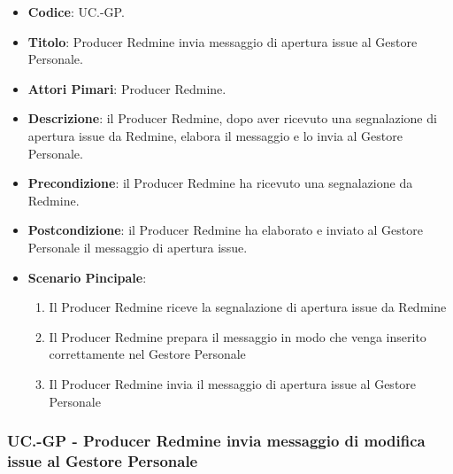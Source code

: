 	\begin{itemize}
		\item \textbf{Codice}: UC\theuccount.\thesubuccount-GP.
		\item \textbf{Titolo}: Producer Redmine invia messaggio di apertura issue al Gestore Personale.
		\item \textbf{Attori Pimari}: Producer Redmine.
		\item \textbf{Descrizione}: il Producer Redmine, dopo aver
		ricevuto una segnalazione di apertura issue da Redmine, elabora il messaggio e lo invia al Gestore Personale.
		\item \textbf{Precondizione}: il Producer Redmine ha ricevuto una segnalazione da Redmine.
		\item \textbf{Postcondizione}: il Producer Redmine ha elaborato e inviato al Gestore Personale il messaggio di apertura issue.

		\item \textbf{Scenario Pincipale}: 
		\begin{enumerate}
			\item Il Producer Redmine riceve la segnalazione di apertura issue da Redmine
			\item Il Producer Redmine prepara il messaggio in modo che venga inserito correttamente nel Gestore Personale
			\item Il Producer Redmine invia il messaggio di
			apertura issue al Gestore Personale
		\end{enumerate}
		
	\end{itemize}
	
	\subsubsection{UC\theuccount.\thesubuccount-GP - Producer Redmine invia messaggio di modifica issue al Gestore Personale}
		
